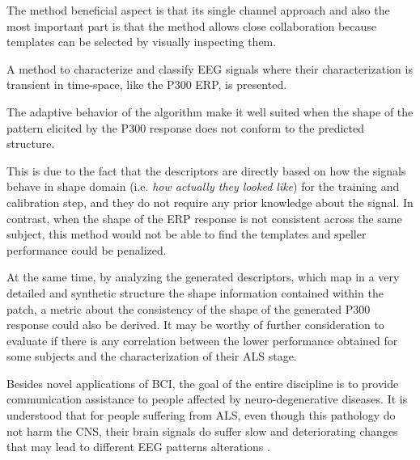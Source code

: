 \documentclass[entropy,article,submit,moreauthors,pdftex,10pt,a4paper]{mdpi}
\begin{document}



The method beneficial aspect is that its single channel approach and also the most important part is that the method allows close collaboration because templates can be selected by visually inspecting them.

A method to characterize and classify EEG signals where their characterization is transient in time-space, like the P300 ERP, is presented.   


The adaptive behavior of the algorithm make it well suited when the shape of the pattern elicited by the P300 response does not conform to the predicted structure.  

This is due to the fact that the descriptors are directly based on how the signals behave in shape domain (i.e. \textit{how actually they looked like}) for the training and calibration step, and they do not require any prior knowledge about the signal.   In contrast, when the shape of the ERP response is not consistent across the same subject, this method would not be able to find the templates and speller performance could be penalized.  

At the same time, by analyzing the generated descriptors, which map in a very detailed and synthetic structure the shape information contained within the patch, a metric about the consistency of the shape of the generated P300 response could also be derived.  It may be worthy of further consideration to evaluate if there is any correlation between the lower performance obtained for some subjects and the characterization of their ALS stage.

Besides novel applications of BCI, the goal of the entire discipline is to provide communication assistance to people affected by neuro-degenerative diseases.  It is understood that for people suffering from ALS, even though this pathology do not harm the CNS, their brain signals do suffer slow and deteriorating changes that may lead to different EEG patterns alterations \citep{Nijboer2009,Riener2014}.
\end{document}
